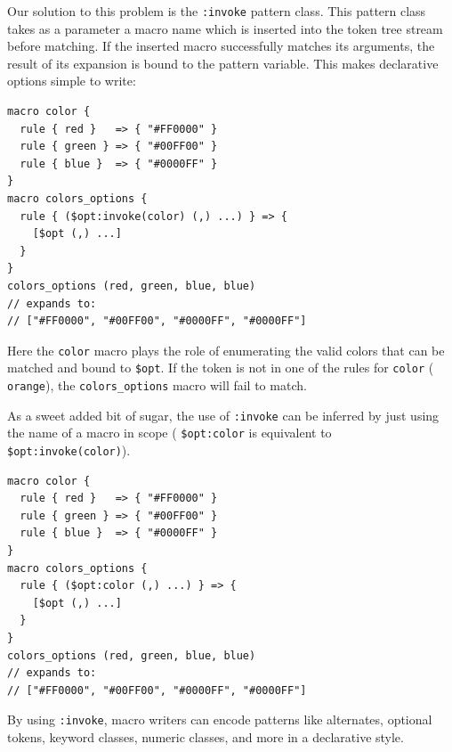 \documentclass[preprint,10pt]{sigplanconf}
\begin{document}
Our solution to this problem is the \verb!:invoke! pattern class.
This pattern class takes as a parameter a macro name which is inserted
into the token tree stream before matching. If the inserted macro
successfully matches its arguments, the result of its expansion is
bound to the pattern variable. This makes declarative options simple
to write:
\begin{lstlisting}
macro color {
  rule { red }   => { "#FF0000" }
  rule { green } => { "#00FF00" }
  rule { blue }  => { "#0000FF" }
}
macro colors_options {
  rule { ($opt:invoke(color) (,) ...) } => { 
    [$opt (,) ...]
  }
}
colors_options (red, green, blue, blue)
// expands to:
// ["#FF0000", "#00FF00", "#0000FF", "#0000FF"]
\end{lstlisting}
Here the \verb!color! macro plays the role of enumerating the
valid colors that can be matched and bound to \verb!$opt!.
If the token is not in one of the rules for \verb!color! (\eg
\verb!orange!), the \verb!colors_options! macro will fail to match.

As a sweet added bit of sugar, the use of \verb!:invoke! can be
inferred by just using the name of a macro in scope (\ie
\verb!$opt:color! is equivalent to
\verb!$opt:invoke(color)!).

\begin{lstlisting}
macro color {
  rule { red }   => { "#FF0000" }
  rule { green } => { "#00FF00" }
  rule { blue }  => { "#0000FF" }
}
macro colors_options {
  rule { ($opt:color (,) ...) } => { 
    [$opt (,) ...]
  }
}
colors_options (red, green, blue, blue)
// expands to:
// ["#FF0000", "#00FF00", "#0000FF", "#0000FF"]
\end{lstlisting}

By using \verb!:invoke!, macro writers can encode patterns
like alternates, optional tokens, keyword classes, numeric classes,
and more in a declarative style.



\end{document}
